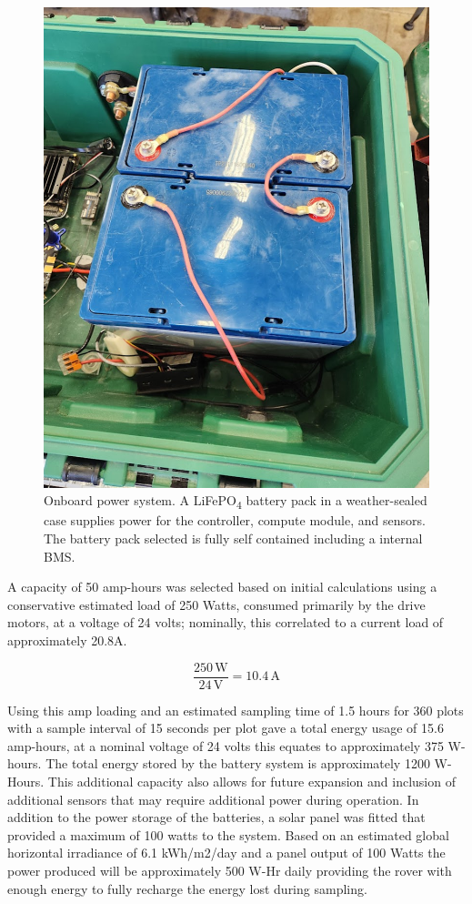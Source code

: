 \begin{figure}[!ht]
    \centering
    \includegraphics[width=0.5\linewidth]{images/Batteries.jpg}
    \caption{Onboard power system. A LiFePO\textsubscript{4} battery pack in a weather-sealed case supplies power for the controller, compute module, and sensors. The battery pack selected is fully self contained including a internal BMS.}
    \label{fig:Battery System}
\end{figure}

A capacity of 50 amp-hours was selected based on initial calculations using a conservative estimated load of 250 Watts, consumed primarily by the drive motors, at a voltage of 24 volts; nominally, this correlated to a current load of approximately 20.8A.

\begin{equation}
    \frac{250 \, \text{W}}{24 \, \text{V}} = 10.4 \, \text{A}
    \label{eq:power_equation}
\end{equation}

Using this amp loading and an estimated sampling time of 1.5 hours for 360 plots with a sample interval of 15 seconds per plot gave a total energy usage of 15.6 amp-hours, at a nominal voltage of 24 volts this equates to approximately 375 W-hours. The total energy stored by the battery system is approximately 1200 W-Hours. This additional capacity also allows for future expansion and inclusion of additional sensors that may require additional power during operation. In addition to the power storage of the batteries, a solar panel was fitted that provided a maximum of 100 watts to the system. Based on an estimated global horizontal irradiance of 6.1 kWh/m2/day\cite{nrel_pvwatts_2024} and a panel output of 100 Watts the power produced will be approximately 500 W-Hr daily providing the rover with enough energy to fully recharge the energy lost during sampling.

